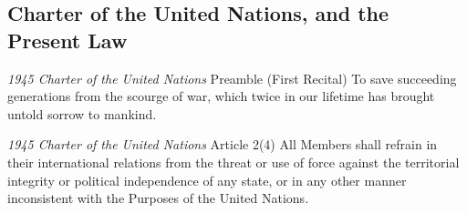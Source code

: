 \subsection{Charter of the United Nations, and the Present Law}

\begin{conventiondetails}{\textit{1945 Charter of the United Nations} Preamble (First Recital)}
    \flushleft
    To save succeeding generations from the scourge of war, which twice in our lifetime has brought untold sorrow to mankind.
\end{conventiondetails}

\begin{conventiondetails}{\textit{1945 Charter of the United Nations} Article 2(4)}
    \flushleft
    All Members shall refrain in their international relations from the threat or use of force against the territorial integrity or political independence of any state, or in any other manner inconsistent with the Purposes of the United Nations.
\end{conventiondetails}

